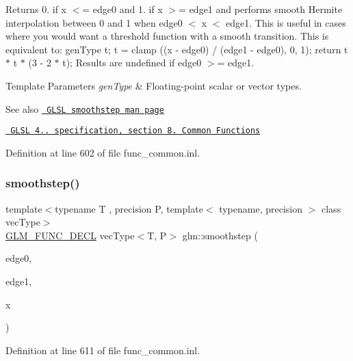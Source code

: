 Returns 0. if x $<$= edge0 and 1. if x $>$= edge1 and performs smooth Hermite interpolation between 0 and 1 when edge0 $<$ x $<$ edge1. This is useful in cases where you would want a threshold function with a smooth transition. This is equivalent to\+: gen\+Type t; t = clamp ((x -\/ edge0) / (edge1 -\/ edge0), 0, 1); return t $\ast$ t $\ast$ (3 -\/ 2 $\ast$ t); Results are undefined if edge0 $>$= edge1.


\begin{DoxyTemplParams}{Template Parameters}
{\em gen\+Type} & Floating-\/point scalar or vector types.\\
\hline
\end{DoxyTemplParams}
\begin{DoxySeeAlso}{See also}
\href{http://www.opengl.org/sdk/docs/manglsl/xhtml/smoothstep.xml}{\texttt{ G\+L\+SL smoothstep man page}} 

\href{http://www.opengl.org/registry/doc/GLSLangSpec.4.20.8.pdf}{\texttt{ G\+L\+SL 4.. specification, section 8. Common Functions}} 
\end{DoxySeeAlso}


Definition at line 602 of file func\+\_\+common.\+inl.

\mbox{\label{group__core__func__common_gaeb3d9cf6e832b6d0000cd76e04cef682}} 
\subsubsection{\texorpdfstring{smoothstep()}{smoothstep()}\hspace{0.1cm}{\footnotesize\ttfamily [2/3]}}
{\footnotesize\ttfamily template$<$typename T , precision P, template$<$ typename, precision $>$ class vec\+Type$>$ \\
\mbox{\hyperlink{setup_8hpp_ab2d052de21a70539923e9bcbf6e83a51}{G\+L\+M\+\_\+\+F\+U\+N\+C\+\_\+\+D\+E\+CL}} vec\+Type$<$T, P$>$ glm\+::smoothstep (\begin{DoxyParamCaption}\item[{T}]{edge0,  }\item[{T}]{edge1,  }\item[{vec\+Type$<$ T, P $>$ const \&}]{x }\end{DoxyParamCaption})}



Definition at line 611 of file func\+\_\+common.\+inl.

